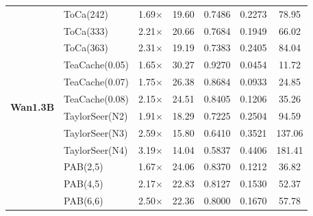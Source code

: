 {\begin{tabular}{l l c c c c c}
\multirow{12}{*}{\textbf{Wan1.3B}}
& ToCa(242)        & 1.69$\times$ & 19.60 & 0.7486 & 0.2273 & 78.95 \\
& ToCa(333)        & 2.21$\times$ & 20.66 & 0.7684 & 0.1949 & 66.02 \\
& ToCa(363)        & 2.31$\times$ & 19.19 & 0.7383 & 0.2405 & 84.04 \\
& TeaCache(0.05)   & 1.65$\times$ & 30.27 & 0.9270 & 0.0454 & 11.72 \\
& TeaCache(0.07)   & 1.75$\times$ & 26.38 & 0.8684 & 0.0933 & 24.85 \\
& TeaCache(0.08)   & 2.15$\times$ & 24.51 & 0.8405 & 0.1206 & 35.26 \\
& TaylorSeer(N2)   & 1.91$\times$ & 18.29 & 0.7225 & 0.2504 & 94.59 \\
& TaylorSeer(N3)   & 2.59$\times$ & 15.80 & 0.6410 & 0.3521 & 137.06 \\
& TaylorSeer(N4)   & 3.19$\times$ & 14.04 & 0.5837 & 0.4406 & 181.41 \\
& PAB(2,5)         & 1.67$\times$ & 24.06 & 0.8370 & 0.1212 & 36.82 \\
& PAB(4,5)         & 2.17$\times$ & 22.83 & 0.8127 & 0.1530 & 52.37 \\
& PAB(6,6)         & 2.50$\times$ & 22.36 & 0.8000 & 0.1670 & 57.78 \\
\bottomrule
\end{tabular}
}